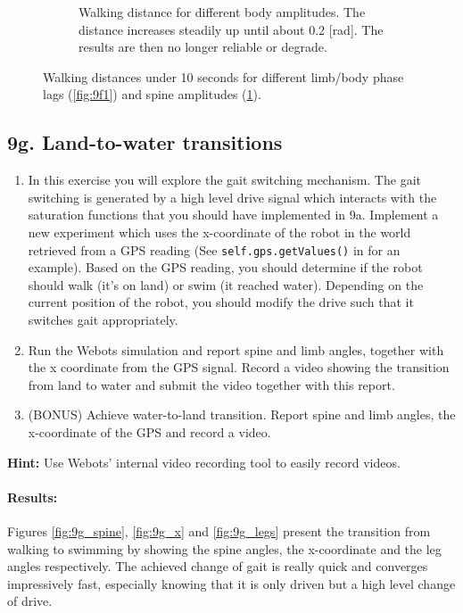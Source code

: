 \documentclass{cmc}
\begin{document}
\begin{figure}[!ht]
\begin{subfigure}[b]{0.48\textwidth}
    \caption{Walking distance for different body amplitudes. The distance increases steadily up until about 0.2 [rad]. The results are then no longer reliable or degrade. }
    \label{fig:9f2}
  \end{subfigure}
  \caption{Walking distances under 10 seconds for different limb/body phase lags (\ref{fig:9f1}) and spine amplitudes (\ref{fig:9f2}).}
  \label{fig:9f}
\end{figure}




\subsection*{9g. Land-to-water transitions}

\begin{enumerate}
\item In this exercise you will explore the gait switching mechanism. The gait
  switching is generated by a high level drive signal which interacts with the
  saturation functions that you should have implemented in 9a. Implement a new
  experiment which uses the x-coordinate of the robot in the world retrieved
  from a GPS reading (See \texttt{self.gps.getValues()} in
   for an example). Based on the GPS reading,
  you should determine if the robot should walk (it’s on land) or swim (it
  reached water). Depending on the current position of the robot, you should
  modify the drive such that it switches gait appropriately.
\item Run the Webots simulation and report spine and limb angles, together with
  the x coordinate from the GPS signal. Record a video showing the transition
  from land to water and submit the video together with this report.
\item (BONUS) Achieve water-to-land transition. Report spine and limb angles,
  the x-coordinate of the GPS and record a video.
\end{enumerate}

\textbf{Hint:} Use Webots’ internal video recording tool to easily record
videos.

\paragraph{Results:}
Figures \ref{fig:9g_spine}, \ref{fig:9g_x} and \ref{fig:9g_legs} present the transition from walking to swimming by showing the spine angles, the x-coordinate and the leg angles respectively. The achieved change of gait is really quick and converges impressively fast, especially knowing that it is only driven but a high level change of drive. 
\end{document}
